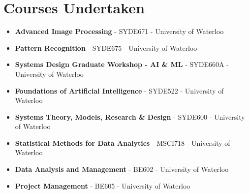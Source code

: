 \documentclass{ExpressiveResume}
\begin{document}

\section{Courses Undertaken}
\begin{itemize}
\item {\textbf{Advanced Image Processing} - SYDE671 - University of Waterloo}
\item {\textbf{Pattern Recognition} - SYDE675 - University of Waterloo}
\item {\textbf{Systems Design Graduate Workshop - AI \& ML} - SYDE660A - University of Waterloo}
\item {\textbf{Foundations of Artificial Intelligence} - SYDE522 - University of Waterloo}
\item {\textbf{Systems Theory, Models, Research \& Design} - SYDE600 - University of Waterloo}

\item {\textbf{Statistical Methods for Data Analytics} - MSCI718 - University of Waterloo}
\item {\textbf{Data Analysis and Management} - BE602 - University of Waterloo}
\item {\textbf{Project Management} - BE605 - University of Waterloo}
\end{itemize}
\end{document}
